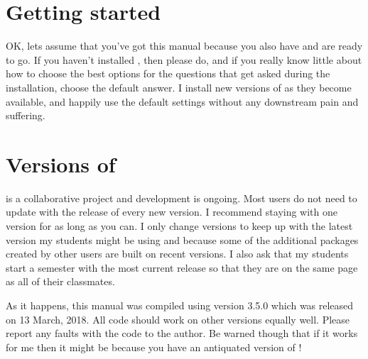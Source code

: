 \section{Getting started} 
 
OK, lets assume that you've got this manual because you also have \R{} and are ready to go. If you haven't installed \R{}, then please do, and if you really know little about how to choose the best options for the questions that get asked during the installation, choose the default answer. I install new versions of \R{} as they become available, and happily use the default settings without any downstream pain and suffering. 
 
\section{Versions of \R{}} 
 
\R{} is a collaborative project and development is ongoing. Most users do not need to update \R{} with the release of every new version. I recommend staying with one \R{} version for as long as you can. I only change versions to keep up with the latest version my students might be using and because some of the additional packages created by other \R{} users are built on recent versions.  I also ask that my students start a semester with the most current release so that they are on the same page as all of their classmates.

 
As it happens, this manual was compiled using version 3.5.0 which was released on 13 March, 2018. All code should work on other versions equally well. Please report any faults with the code to the author. Be warned though that if it works for me then it might be because you have an antiquated version of \R{}! 
 



